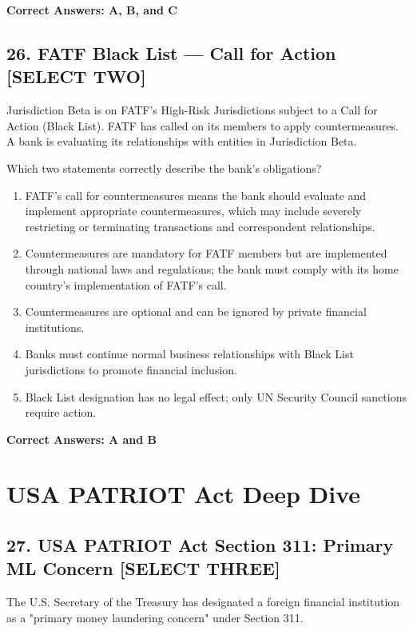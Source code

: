\documentclass[11pt,a4paper]{article}
\begin{document}
	\textbf{Correct Answers: A, B, and C}
	
	\subsection{26. FATF Black List — Call for Action \textnormal{[SELECT TWO]}}
	
	Jurisdiction Beta is on FATF's High-Risk Jurisdictions subject to a Call for Action (Black List). FATF has called on its members to apply countermeasures. A bank is evaluating its relationships with entities in Jurisdiction Beta.
	
	Which two statements correctly describe the bank's obligations?
	
	\begin{enumerate}[label=\Alph*.]
		\item FATF's call for countermeasures means the bank should evaluate and implement appropriate countermeasures, which may include severely restricting or terminating transactions and correspondent relationships.
		\item Countermeasures are mandatory for FATF members but are implemented through national laws and regulations; the bank must comply with its home country's implementation of FATF's call.
		\item Countermeasures are optional and can be ignored by private financial institutions.
		\item Banks must continue normal business relationships with Black List jurisdictions to promote financial inclusion.
		\item Black List designation has no legal effect; only UN Security Council sanctions require action.
	\end{enumerate}
	
	\textbf{Correct Answers: A and B}
	
	\section{USA PATRIOT Act Deep Dive}
	
	\subsection{27. USA PATRIOT Act Section 311: Primary ML Concern \textnormal{[SELECT THREE]}}
	
	The U.S. Secretary of the Treasury has designated a foreign financial institution as a "primary money laundering concern" under Section 311.
	
\end{document}

